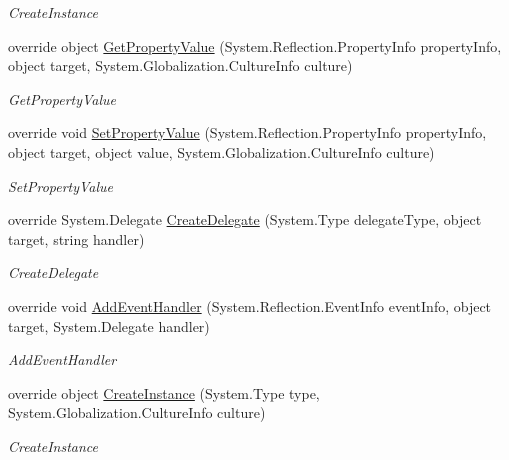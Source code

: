 \begin{DoxyCompactItemize}
\begin{DoxyCompactList}\small\item\em Create\+Instance \end{DoxyCompactList}\item 
override object \hyperlink{class_xaml_generated_namespace_1_1_generated_internal_type_helper_afdc9fe15b56607d02082908d934480c6}{Get\+Property\+Value} (System.\+Reflection.\+Property\+Info property\+Info, object target, System.\+Globalization.\+Culture\+Info culture)
\begin{DoxyCompactList}\small\item\em Get\+Property\+Value \end{DoxyCompactList}\item 
override void \hyperlink{class_xaml_generated_namespace_1_1_generated_internal_type_helper_ade0f04c0f7b18dd5b170e071d5534d38}{Set\+Property\+Value} (System.\+Reflection.\+Property\+Info property\+Info, object target, object value, System.\+Globalization.\+Culture\+Info culture)
\begin{DoxyCompactList}\small\item\em Set\+Property\+Value \end{DoxyCompactList}\item 
override System.\+Delegate \hyperlink{class_xaml_generated_namespace_1_1_generated_internal_type_helper_a8ec4c37e82d9f4e867e9655f4eac3a78}{Create\+Delegate} (System.\+Type delegate\+Type, object target, string handler)
\begin{DoxyCompactList}\small\item\em Create\+Delegate \end{DoxyCompactList}\item 
override void \hyperlink{class_xaml_generated_namespace_1_1_generated_internal_type_helper_a73471f4a6d1ca4c4fceec9ad8610f0c8}{Add\+Event\+Handler} (System.\+Reflection.\+Event\+Info event\+Info, object target, System.\+Delegate handler)
\begin{DoxyCompactList}\small\item\em Add\+Event\+Handler \end{DoxyCompactList}\item 
override object \hyperlink{class_xaml_generated_namespace_1_1_generated_internal_type_helper_aefb7a98fceb9c287cef4756942f441d1}{Create\+Instance} (System.\+Type type, System.\+Globalization.\+Culture\+Info culture)
\begin{DoxyCompactList}\small\item\em Create\+Instance \end{DoxyCompactList}\item 

\end{DoxyCompactItemize}
